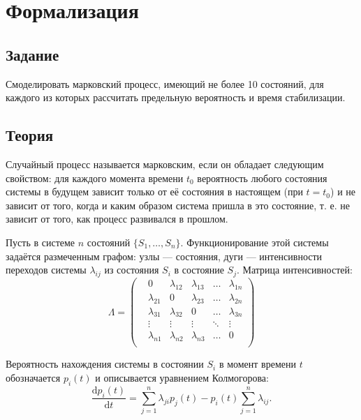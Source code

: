 \documentclass[a4paper,oneside,12pt]{extreport}
\begin{document}


\tableofcontents

\chapter{Формализация}

\section{Задание}

Смоделировать марковский процесс, имеющий не более 10 состояний, для каждого из которых рассчитать предельную вероятность и время стабилизации.

\section{Теория}

Случайный процесс называется марковским, если он обладает следующим свойством: для каждого момента времени $t_0$ вероятность любого состояния системы в будущем зависит только от её состояния в настоящем (при $t = t_0$) и не зависит от того, когда и каким образом система пришла в это состояние, т. е. не зависит от того, как процесс развивался в прошлом.

Пусть в системе $n$ состояний $\{S_1, \ldots, S_n\}$.
Функционирование этой системы задаётся размеченным графом: узлы — состояния, дуги — интенсивности переходов системы $\lambda_{ij}$ из состояния $S_i$ в состояние $S_j$.
Матрица интенсивностей:
\begin{equation}
	\Lambda = \begin{pmatrix}
		&0 &\lambda_{12} &\lambda_{13} &\ldots &\lambda_{1n} \\
		&\lambda_{21} &0 &\lambda_{23} &\ldots &\lambda_{2n} \\
		&\lambda_{31} &\lambda_{32} &0 &\ldots &\lambda_{3n} \\
		&\vdots &\vdots &\vdots &\ddots &\vdots \\
		&\lambda_{n1} &\lambda_{n2} &\lambda_{n3} &\ldots &0 \\
	\end{pmatrix}
\end{equation}

Вероятность нахождения системы в состоянии $S_i$ в момент времени $t$ обозначается $p_i(t)$ и описывается уравнением Колмогорова:
\begin{equation}
	\label{eqn:kolmogorov}
	\frac{\mathrm dp_i(t)}{\mathrm dt} = \sum_{j = 1}^{n} \lambda_{ji} p_j(t) - p_i(t) \sum_{j = 1}^{n} \lambda_{ij}.
\end{equation}
\end{document}
